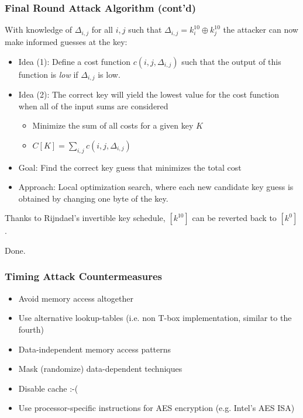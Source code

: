 \documentclass[9pt,handout]{beamer}
\begin{document}
\begin{frame}
	\frametitle{Final Round Attack Algorithm (cont'd)}
	With knowledge of $\Delta_{i,j}$ for all $i,j$ such that $\Delta_{i,j} = k_i^{10} \oplus k_j^{10}$ the attacker can now make informed guesses at the key:
	\begin{itemize}
		\item Idea (1): Define a cost function $c(i,j,\Delta_{i,j})$ such that the output of this function is \emph{low} if $\Delta_{i,j}$ is low.
		\item Idea (2): The correct key will yield the lowest value for the cost function when all of the input sums are considered 
		\begin{itemize}
			\item Minimize the sum of all costs for a given key $K$
			\item $C[K] = \sum_{i,j}c(i,j,\Delta_{i,j})$
		\end{itemize}
		\item Goal: Find the correct key guess that minimizes the total cost
		\item Approach: Local optimization search, where each new candidate key guess is obtained by changing one byte of the key.
	\end{itemize}
	
	\bigskip
	
	Thanks to Rijndael's invertible key schedule, $[k^{10}]$ can be reverted back to $[k^{0}]$.
	
	\bigskip
	
	Done.
\end{frame}

\begin{frame}
	\frametitle{Timing Attack Countermeasures}
	\begin{itemize}
		\item Avoid memory access altogether
		\item Use alternative lookup-tables (i.e. non T-box implementation, similar to the fourth)
		\item Data-independent memory access patterns %
		\item Mask (randomize) data-dependent techniques
		\item Disable cache :-(
		\item Use processor-specific instructions for AES encryption (e.g. Intel's AES ISA)
	\end{itemize}
\end{frame}	
\end{document}
